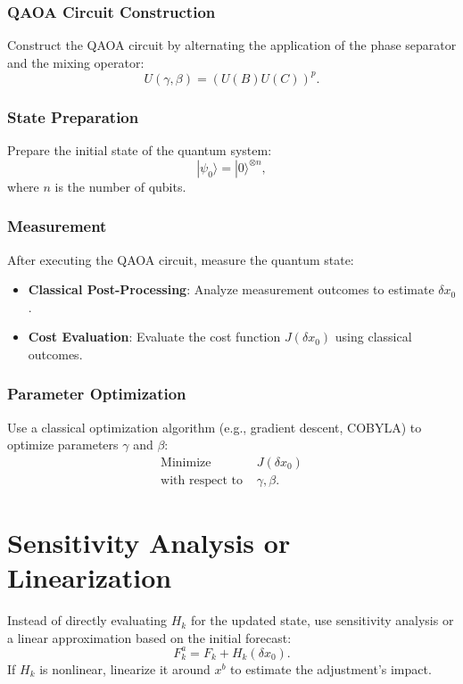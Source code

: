 \documentclass{article}
\begin{document}
\subsubsection{QAOA Circuit Construction}
Construct the QAOA circuit by alternating the application of the phase separator and the mixing operator:
\[
    U(\gamma, \beta) = (U(B) U(C))^p.
\]

\subsubsection{State Preparation}
Prepare the initial state of the quantum system:
\[
    | \psi_0 \rangle = |0\rangle^{\otimes n},
\]
where \(n\) is the number of qubits.

\subsubsection{Measurement}
After executing the QAOA circuit, measure the quantum state:
\begin{itemize}
    \item \textbf{Classical Post-Processing}: Analyze measurement outcomes to estimate \(\delta x_0\).
    \item \textbf{Cost Evaluation}: Evaluate the cost function \(J(\delta x_0)\) using classical outcomes.
\end{itemize}

\subsubsection{Parameter Optimization}
Use a classical optimization algorithm (e.g., gradient descent, COBYLA) to optimize parameters \(\gamma\) and \(\beta\):
\begin{align*}
    \text{Minimize } & J(\delta x_0) \\
    \text{with respect to } & \gamma, \beta.
\end{align*}

\section{Sensitivity Analysis or Linearization}
Instead of directly evaluating \(H_k\) for the updated state, use sensitivity analysis or a linear approximation based on the initial forecast:
\[
    F_k^a = F_k + H_k(\delta x_0).
\]
If \(H_k\) is nonlinear, linearize it around \(x^b\) to estimate the adjustment’s impact.
\end{document}
